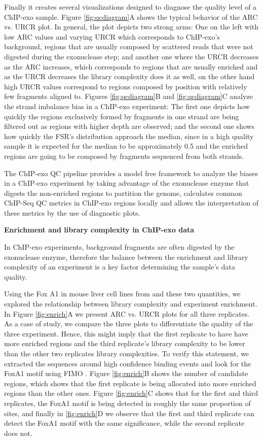 \documentclass{bmcart}\usepackage[]{graphicx}\usepackage[]{color}
\begin{document}
Finally it creates several visualizations designed to diagnose the
quality level of a ChIP-exo sample. Figure \ref{fig:qcdiagram}A shows
the typical behavior of the ARC vs. URCR plot. In general, the plot
depicts two strong arms: One on the left with low ARC values and
varying URCR which corresponds to ChIP-exo's background, regions that
are usually composed by scattered reads that were not digested during
the exonuclease step; and another one where the URCR decreases as the
ARC increases, which corresponds to regions that are usually enriched
and as the URCR decreases the library complexity does it as well, on
the other hand high URCR values correspond to regions composed by
position with relatively few fragments aligned to. Figures
\ref{fig:qcdiagram}B and \ref{fig:qcdiagram}C analyze the strand
imbalance bias in a ChIP-exo experiment: The first one depicts how
quickly the regions exclusively formed by fragments in one strand are
being filtered out as regions with higher depth are observed; and the
second one shows how quickly the FSR's distribution approach the
median, since in a high quality sample it is expected for the median
to be approximately 0.5 and the enriched regions are going to be
composed by fragments sequenced from both strands.

The ChIP-exo QC pipeline provides a model free framework to analyze
the biases in a ChIP-exo experiment by taking advantage of the
exonuclease enzyme that digests the non-enriched regions to partition
the genome, calculates common ChIP-Seq QC metrics in ChIP-exo regions
locally and allows the interpretation of these metrics by the use of
diagnostic plots.

\textbf{Enrichment and library complexity in ChIP-exo data}


In ChIP-exo experiments, background fragments are often digested by
the exonuclease enzyme, therefore the balance between the enrichment
and library complexity of an experiment is a key factor determining
the sample's data quality.

Using the Fox A1 in mouse liver cell lines from \cite{exoillumina} and
these two quantities, we explored the relationship between library
complexity and experiment enrichment. In Figure \ref{fig:enrich}A we
present ARC vs. URCR plots for all three replicates. As a case of
study, we compare the three plots to differentiate the quality of the
three experiment. Hence, this might imply that the first replicate to
have have more enriched regions and the third replicate's library
complexity to be lower than the other two replicates library
complexities. To verify this statement, we extracted the sequences
around high confidence binding events and look for the FoxA1 motif
using FIMO \cite{fimo}. Figure \ref{fig:enrich}B shows the number of
candidate regions, which shows that the first replicate is being
allocated into more enriched regions than the other ones. Figure
\ref{fig:enrich}C shows that for the first and third replicates, the
FoxA1 motif is being detected in roughly the same proportion of sites,
and finally in \ref{fig:enrich}D we observe that the first and third
replicate can detect the FoxA1 motif with the same significance, while
the second replicate does not.
\end{document}

